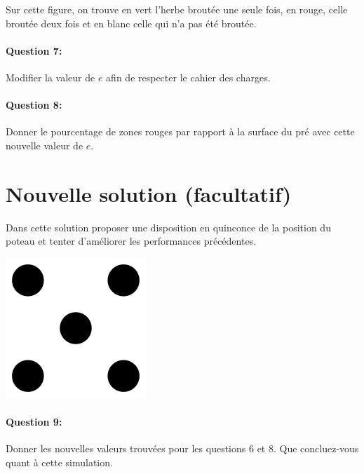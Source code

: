 Sur cette figure, on trouve en vert l'herbe broutée une seule fois, en rouge, celle broutée deux fois et en blanc celle qui n'a pas été broutée.

\paragraph{Question 7:} Modifier la valeur de $e$ afin de respecter le cahier des charges.

\paragraph{Question 8:} Donner le pourcentage de zones \og rouges \fg  par rapport à la surface du pré avec cette nouvelle valeur de $e$.

\section{Nouvelle solution (facultatif)}

Dans cette solution proposer une disposition en quinconce de la position du poteau et tenter d'améliorer les performances précédentes.

\begin{center}
 \includegraphics[width=0.2\linewidth]{img/quinconce}
\end{center}

\paragraph{Question 9:} Donner les nouvelles valeurs trouvées pour les questions 6 et 8. Que concluez-vous quant à cette simulation.

